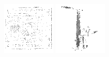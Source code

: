 \documentclass{article}
\begin{document}
\begin{figure}[!b]
\begin{minipage}[c]{.21\linewidth}
  \end{minipage}
  \begin{minipage}[c]{.21\linewidth}
    \centering\centerline{\includegraphics[width=\linewidth]{imgs/dennis_cal/dollar/sums/497_994.png}}
  \end{minipage}
  \begin{minipage}[c]{.21\linewidth}
    \centering\centerline{\includegraphics[width=\linewidth]{imgs/dennis_cal/saxophone/sums/497_994.png}}

\end{minipage}
\end{figure}
\end{document}
